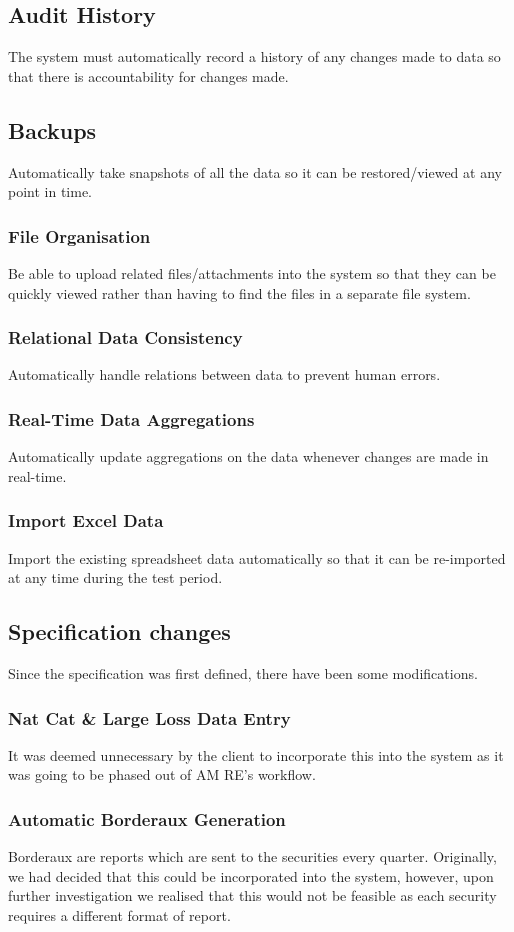 \documentclass[12pt]{article}
\begin{document}
\subsection*{Audit History}
The system must automatically record a history of any changes made to data so that there is accountability for changes made.
\subsection*{Backups}
Automatically take snapshots of all the data so it can be restored/viewed at any point in time.
\subsubsection*{File Organisation}
Be able to upload related files/attachments into the system so that they can be quickly viewed rather than having to find the files in a separate file system.
\subsubsection*{Relational Data Consistency}
Automatically handle relations between data to prevent human errors.
\subsubsection*{Real-Time Data Aggregations}
Automatically update aggregations on the data whenever changes are made in real-time.
\subsubsection*{Import Excel Data}
Import the existing spreadsheet data automatically so that it can be re-imported at any time during the test period.

\subsection{Specification changes}
Since the specification was first defined, there have been some modifications.

\subsubsection*{Nat Cat \& Large Loss Data Entry}
It was deemed unnecessary by the client to incorporate this into the system as it was going to be phased out of AM RE's workflow.
\subsubsection*{Automatic Borderaux Generation}
Borderaux are reports which are sent to the securities every quarter. Originally, we had decided that this could be incorporated into the system, however, upon further investigation we realised that this would not be feasible as each security requires a different format of report.
\end{document}
